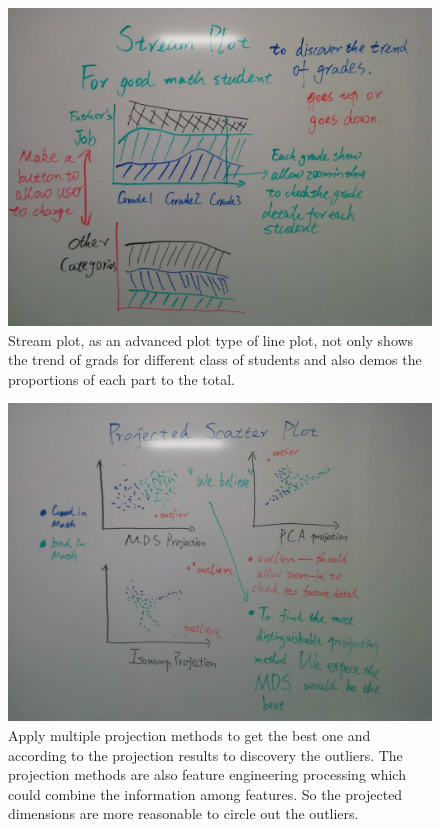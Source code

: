\documentclass{article}
\begin{document}
\begin{figure}[H]
\centering
\includegraphics[scale=0.23]{stream_plot.jpg}
\caption{Stream plot, as an advanced plot type of line plot, not only shows the trend of grads for different class of students and also demos the proportions of each part to the total.}
\end{figure}

\begin{figure}[H]
\centering
\includegraphics[scale=0.23]{projected_scatter.jpg}
\caption{Apply multiple projection methods to get the best one and according to the projection results to discovery the outliers. The projection methods are also feature engineering processing which could combine the information among features. So the projected dimensions are more reasonable to circle out the outliers.}
\end{figure}
\end{document}
